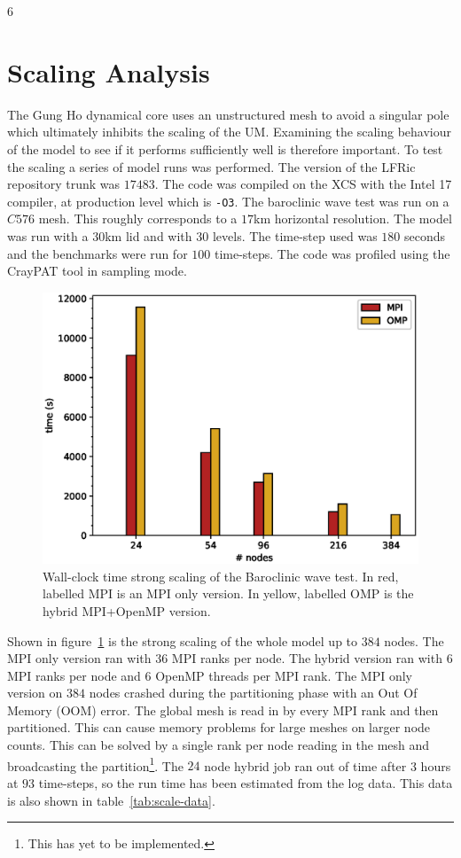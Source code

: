 6\section{\label{sec:scale}Scaling Analysis}
The Gung Ho dynamical core uses an unstructured mesh to avoid a
singular pole which ultimately inhibits the scaling of the
UM. Examining the scaling behaviour of the model to see if it
performs sufficiently well is therefore important. To test the scaling a series
of model runs was performed. The version of the LFRic repository trunk
was $17483$. The code was compiled on the XCS with the Intel 17
compiler, at production level which is \verb+-O3+. The baroclinic wave
test was run on a $C576$ mesh. This roughly corresponds to a $17$km
horizontal resolution. The model was run with a $30$km lid and with
$30$ levels.  The time-step used was $180$
seconds and the benchmarks were run for $100$ time-steps. The code was
profiled using the CrayPAT tool in sampling mode. 

\begin{figure}
\centering\includegraphics[width=1.0\linewidth]{figs/wc-scale.eps}
\caption{\label{fig:wc_scale}Wall-clock time strong scaling of the 
  Baroclinic wave test. In red, labelled MPI is an MPI only
  version. In yellow, labelled OMP is the hybrid MPI+OpenMP version.}
\end{figure} 

Shown in figure~\ref{fig:wc_scale} is the strong scaling of the whole
model up to $384$ nodes. The MPI only version ran with $36$ MPI ranks
per node. The hybrid version ran with $6$ MPI ranks per node and $6$
OpenMP threads per MPI rank. The MPI only version on $384$ nodes
crashed during the partitioning phase with an Out Of Memory (OOM)
error. The global mesh is read in by every MPI rank and then
partitioned. This can cause memory problems for large meshes on larger
node counts. This can be solved by a single rank per node reading in
the mesh and broadcasting the partition\footnote{This has yet to be implemented.}. The $24$ node hybrid job ran
out of time after 3 hours at $93$ time-steps, so the run time has been
estimated from the log data. This data is also shown in
table~\ref{tab:scale-data}.

